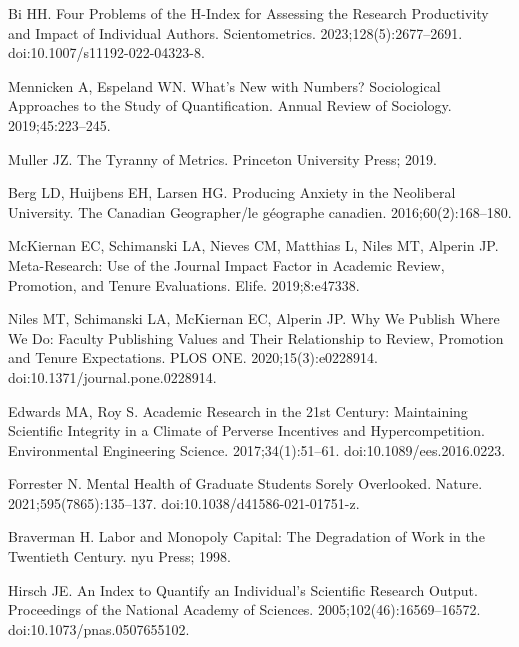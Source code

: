 \documentclass[
  10pt,
  letterpaper,
]{article}
\begin{document}
\begin{thebibliography}{10}
Bi HH.
\newblock Four Problems of the H-Index for Assessing the Research Productivity and Impact of Individual Authors.
\newblock Scientometrics. 2023;128(5):2677--2691.
\newblock doi:{10.1007/s11192-022-04323-8}.

Mennicken A, Espeland WN.
\newblock What's New with Numbers? {{Sociological}} Approaches to the Study of Quantification.
\newblock Annual Review of Sociology. 2019;45:223--245.

Muller JZ.
\newblock The Tyranny of Metrics.
\newblock Princeton University Press; 2019.

Berg LD, Huijbens EH, Larsen HG.
\newblock Producing Anxiety in the Neoliberal University.
\newblock The Canadian Geographer/le g{\'e}ographe canadien. 2016;60(2):168--180.

McKiernan EC, Schimanski LA, Nieves CM, Matthias L, Niles MT, Alperin JP.
\newblock Meta-Research: {{Use}} of the Journal Impact Factor in Academic Review, Promotion, and Tenure Evaluations.
\newblock Elife. 2019;8:e47338.

Niles MT, Schimanski LA, McKiernan EC, Alperin JP.
\newblock Why We Publish Where We Do: {{Faculty}} Publishing Values and Their Relationship to Review, Promotion and Tenure Expectations.
\newblock PLOS ONE. 2020;15(3):e0228914.
\newblock doi:{10.1371/journal.pone.0228914}.

Edwards MA, Roy S.
\newblock Academic {{Research}} in the 21st {{Century}}: {{Maintaining Scientific Integrity}} in a {{Climate}} of {{Perverse Incentives}} and {{Hypercompetition}}.
\newblock Environmental Engineering Science. 2017;34(1):51--61.
\newblock doi:{10.1089/ees.2016.0223}.

Forrester N.
\newblock Mental Health of Graduate Students Sorely Overlooked.
\newblock Nature. 2021;595(7865):135--137.
\newblock doi:{10.1038/d41586-021-01751-z}.

Braverman H.
\newblock Labor and Monopoly Capital: {{The}} Degradation of Work in the Twentieth Century.
\newblock nyu Press; 1998.

Hirsch JE.
\newblock An Index to Quantify an Individual's Scientific Research Output.
\newblock Proceedings of the National Academy of Sciences. 2005;102(46):16569--16572.
\newblock doi:{10.1073/pnas.0507655102}.


\end{thebibliography}
\end{document}
